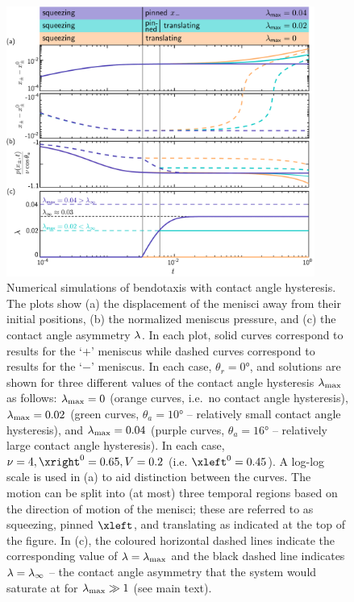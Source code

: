 \begin{figure}[h!]
\centering
\includegraphics[width = 0.9\textwidth]{example_solutions_stacked_v3}
\caption{Numerical simulations of bendotaxis with contact angle hysteresis. The plots show (a) the displacement of the menisci away from their initial positions, (b) the normalized meniscus pressure, and (c) the contact angle asymmetry $\lambda$.  In each plot, solid curves correspond to results for the `$+$' meniscus while dashed curves correspond to  results for the `$-$' meniscus. In each case, $\theta_r = 0\si{\degree}$, and solutions are shown for three different values of the contact angle hysteresis $\lambda_{\text{max}}$ as follows: $\lambda_{\text{max}} = 0$ (orange curves, i.e.~no contact angle hysteresis), $\lambda_{\text{max}} = 0.02$ (green curves,  $\theta_a = 10\si{\degree}$ -- relatively small contact angle hysteresis), and $\lambda_{\text{max}} = 0.04$ (purple curves, $\theta_a = 16\si{\degree}$ -- relatively large contact angle hysteresis). In each case, $\nu =  4, \xright^0 = 0.65, V = 0.2$ (i.e. $\xleft^0= 0.45$).  A log-log scale is used in (a) to aid distinction between the curves. The motion can be split into (at most) three temporal regions based on the direction of motion of the menisci; these are referred to as squeezing, pinned $\xleft$, and translating as indicated at the top of the figure. In (c), the coloured horizontal dashed lines indicate the corresponding value of $\lambda = \lambda_{\text{max}}$ and the black dashed line indicates $\lambda = \lambda_{\infty}$ -- the contact angle asymmetry that the system would saturate at for $\lambda_{\text{max}} \gg 1$ (see main text).}\label{fig:Ch4:Hysteresis:ExampleTraces}
\end{figure}


